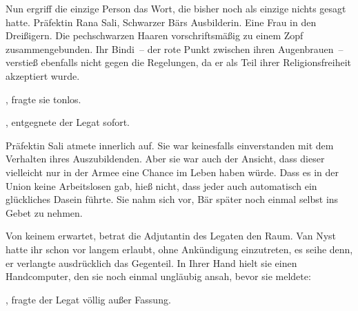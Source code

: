 \par

Nun ergriff die einzige Person das Wort, die bisher noch als einzige nichts gesagt hatte. Präfektin Rana Sali, Schwarzer Bärs Ausbilderin. Eine Frau in den Dreißigern. Die pechschwarzen Haaren vorschriftsmäßig zu einem Zopf zusammengebunden. Ihr Bindi~-- der rote Punkt zwischen ihren Augenbrauen~-- verstieß ebenfalls nicht gegen die Regelungen, da er als Teil ihrer Religionsfreiheit akzeptiert wurde.

\par

, fragte sie tonlos.

\par

, entgegnete der Legat sofort. 

\par

Präfektin Sali atmete innerlich auf. Sie war keinesfalls einverstanden mit dem Verhalten ihres Auszubildenden. Aber sie war auch der Ansicht, dass dieser vielleicht nur in der Armee eine Chance im Leben haben würde. Dass es in der Union keine Arbeitslosen gab, hieß nicht, dass jeder auch automatisch ein glückliches Dasein führte. Sie nahm sich vor, Bär später noch einmal selbst ins Gebet zu nehmen.

\par

Von keinem erwartet, betrat die Adjutantin des Legaten den Raum. Van Nyst hatte ihr schon vor langem erlaubt, ohne Ankündigung einzutreten, es seihe denn, er verlangte ausdrücklich das Gegenteil. In Ihrer Hand hielt sie einen Handcomputer, den sie noch einmal ungläubig ansah, bevor sie meldete: 

\par

, fragte der Legat völlig außer Fassung.

\par

